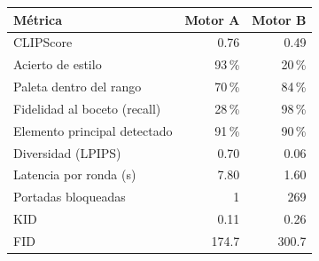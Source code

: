 \begin{tabular}{@{}lrr@{}}
\toprule
\textbf{Métrica} & \textbf{Motor A} & \textbf{Motor B}\\
\midrule
CLIPScore & 0.76 & 0.49\\
Acierto de estilo & 93\,\% & 20\,\%\\
Paleta dentro del rango & 70\,\% & 84\,\%\\
Fidelidad al boceto (recall) & 28\,\% & 98\,\%\\
Elemento principal detectado & 91\,\% & 90\,\%\\
Diversidad (LPIPS) & 0.70 & 0.06\\
Latencia por ronda (s) & 7.80 & 1.60\\
Portadas bloqueadas & 1 & 269\\
KID & 0.11 & 0.26\\
FID & 174.7 & 300.7\\
\bottomrule
\end{tabular}
